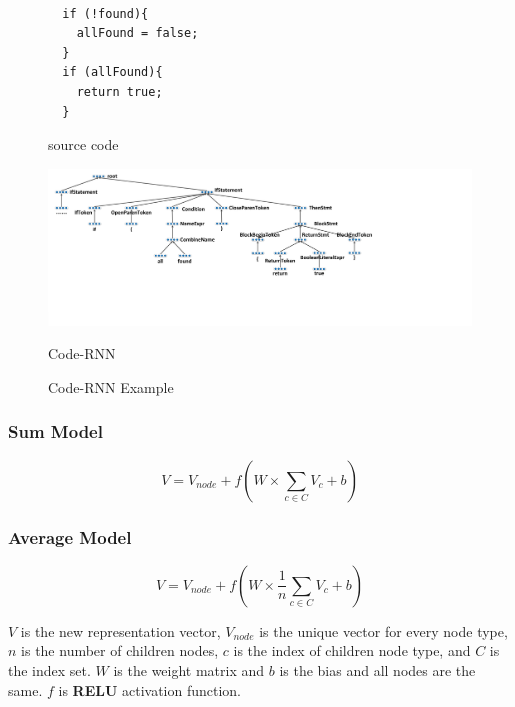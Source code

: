 \begin{figure}[th]
\begin{minipage}{0.15\linewidth}
  \begin{lstlisting}

  if (!found){
    allFound = false;
  }
  if (allFound){
    return true;
  }
\end{lstlisting}
 \centerline{source code}
\end{minipage}
\hfill
\begin{minipage}{0.9\linewidth}
  \centering
	\includegraphics[width=0.9\linewidth]{img/tree_rnn.pdf}
 \centerline{Code-RNN}
\end{minipage}

\caption{Code-RNN Example}\label{fig:code_rnn}
\end{figure}

\subsubsection{Sum Model}

\begin{equation}\label{eq:code_rnn_sum}
V = V_{node} + f(W \times \sum_{c \in C}{ V_{c}} + b)
\end{equation}

\subsubsection{Average Model}

\begin{equation}\label{eq:code_rnn_average}
V = V_{node} + f(W \times \frac{1}{n}\sum_{c \in C}{V_{c}} + b)
\end{equation}

$V$ is the new representation vector, $V_{node}$ is the unique vector for every node type, $n$ is the number of children nodes, $c$ is the index of children node type, and $C$ is the index set. $W$ is the weight matrix and $b$ is the bias and all nodes are the same. $f$ is \textbf{RELU} activation function.

